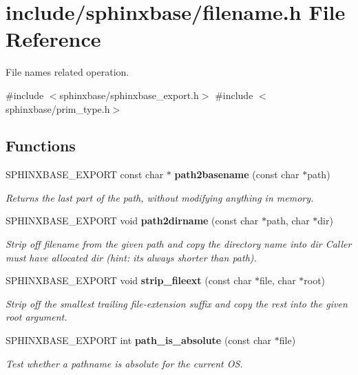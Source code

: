 \section{include/sphinxbase/filename.h File Reference}
\label{filename_8h}


File names related operation.  


{\ttfamily \#include $<$sphinxbase/sphinxbase\+\_\+export.\+h$>$}\newline
{\ttfamily \#include $<$sphinxbase/prim\+\_\+type.\+h$>$}\newline
\subsection*{Functions}
\begin{DoxyCompactItemize}
\item 
\mbox{\label{filename_8h_a532f0fe8616b8c447f82644c1cac7806}} 
S\+P\+H\+I\+N\+X\+B\+A\+S\+E\+\_\+\+E\+X\+P\+O\+RT const char $\ast$ \textbf{ path2basename} (const char $\ast$path)
\begin{DoxyCompactList}\small\item\em Returns the last part of the path, without modifying anything in memory. \end{DoxyCompactList}\item 
\mbox{\label{filename_8h_a678be92ddb74695f26a9e4f527b073b0}} 
S\+P\+H\+I\+N\+X\+B\+A\+S\+E\+\_\+\+E\+X\+P\+O\+RT void \textbf{ path2dirname} (const char $\ast$path, char $\ast$dir)
\begin{DoxyCompactList}\small\item\em Strip off filename from the given path and copy the directory name into dir Caller must have allocated dir (hint\+: it\textquotesingle{}s always shorter than path). \end{DoxyCompactList}\item 
S\+P\+H\+I\+N\+X\+B\+A\+S\+E\+\_\+\+E\+X\+P\+O\+RT void \textbf{ strip\+\_\+fileext} (const char $\ast$file, char $\ast$root)
\begin{DoxyCompactList}\small\item\em Strip off the smallest trailing file-\/extension suffix and copy the rest into the given root argument. \end{DoxyCompactList}\item 
\mbox{\label{filename_8h_ac59add2db73b33e81b354de114268e7a}} 
S\+P\+H\+I\+N\+X\+B\+A\+S\+E\+\_\+\+E\+X\+P\+O\+RT int \textbf{ path\+\_\+is\+\_\+absolute} (const char $\ast$file)
\begin{DoxyCompactList}\small\item\em Test whether a pathname is absolute for the current OS. \end{DoxyCompactList}\end{DoxyCompactItemize}


